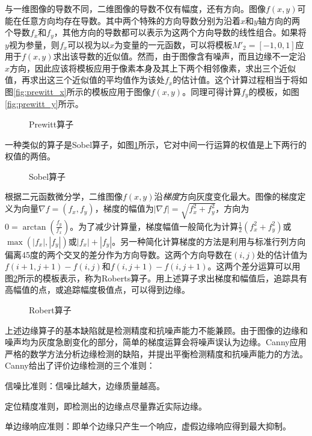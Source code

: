 与一维图像的导数不同，二维图像的导数不仅有幅度，还有方向。图像$f(x,y)$可能在任意方向均存在导数。其中两个特殊的方向导数分别为沿着$x$和$y$轴方向的两个导数$f_x$和$f_y$，其他方向的导数都可以表示为这两个方向导数的线性组合。如果将$y$视为参量，则$f_x$可以视为以$x$为变量的一元函数，可以将模板$M'_2=[-1,0,1]$应用于$f(x,y)$求出该导数的近似值。然而，由于图像含有噪声，而且边缘不一定沿$x$方向，因此应该将模板应用于像素本身及其上下两个相邻像素，求出三个近似值，再求出这三个近似值的平均值作为该处$f_x$的估计值。这个计算过程相当于将如图\ref{fig:prewitt_x}所示的模板应用于图像$f(x,y)$。同理可得计算$f_y$的模板，如图\ref{fig:prewitt_y}所示。
\begin{figure}[!h]
  \centering
  \hspace{1cm}
  \caption{Prewitt算子}
\end{figure}
一种类似的算子是Sobel算子，如图\ref{fig:sobel}所示，它对中间一行运算的权值是上下两行的权值的两倍。
\begin{figure}[!h]
  \centering
  \hspace{1cm}
  \caption{Sobel算子}
  \label{fig:sobel}
\end{figure}

根据二元函数微分学，二维图像$f(x,y)$沿\emph{梯度}方向灰度变化最大。图像的梯度定义为向量$\nabla f=(f_x,f_y)$，梯度的幅值为$|\nabla f|=\sqrt{f_x^2+f_y^2}$，方向为$0=\arctan\left(\frac{f_y}{f_x}\right)$。为了减少计算量，梯度幅值一般简化为计算$\frac{1}{2}(f_x^2+f_y^2)$或$\max(|f_x|,|f_y|)$或$|f_x|+|f_y|$。另一种简化计算梯度的方法是利用与标准行列方向偏离45度的两个交叉的差分作为方向导数。这两个方向导数在$(i,j)$处的估计值为$f(i+1,j+1)-f(i,j)$和$f(i,j+1)-f(i,j+1)$。这两个差分运算可以用图\ref{fig:robert}所示的模板表示，称为Roberts算子。用上述算子求出梯度和幅值后，追踪具有高幅值的点，或追踪幅度极值点，可以得到边缘。
\begin{figure}[!h]
  \centering
  \hspace{1cm}
  \caption{Robert算子}
  \label{fig:robert}
\end{figure}

上述边缘算子的基本缺陷就是检测精度和抗噪声能力不能兼顾。由于图像的边缘和噪声均为灰度急剧变化的部分，简单的梯度运算会将噪声误认为边缘。Canny应用严格的数学方法分析边缘检测的缺陷，并提出平衡检测精度和抗噪声能力的方法。Canny给出了评价边缘检测的三个准则：
\begin{asparaenum}[(1)]
\item 信噪比准则：信噪比越大，边缘质量越高。
\item  定位精度准则，即检测出的边缘点尽量靠近实际边缘。
\item 单边缘响应准则：即单个边缘只产生一个响应，虚假边缘响应得到最大抑制。
\end{asparaenum}

